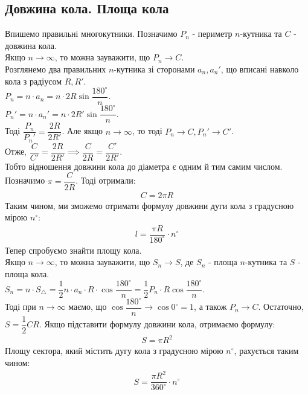 \documentclass[a4paper, 10pt]{article}
\theoremstyle{theoremdd}
\theoremstyle{theoremdd}
\theoremstyle{theoremdd}
\theoremstyle{theoremdd}
\theoremstyle{theoremdd}
\theoremstyle{theoremdd}
\theoremstyle{theoremdd}
\theoremstyle{theoremdd}
\theoremstyle{theoremdd}
\begin{document}
\subsection{Довжина кола. Площа кола}
Впишемо правильні многокутники. Позначимо $P_n$ - периметр $n$-кутника та $C$ - довжина кола. \\
Якщо $n \to \infty$, то можна зауважити, що $P_n \to C$.
\bigskip \\
Розглянемо два правильних $n$-кутника зі сторонами $a_n, a_n'$, що вписані навколо кола з радіусом $R,R'$.\\
$P_n = n \cdot a_n = n \cdot 2R \sin \dfrac{180^\circ}{n}$.\\
$P_n' = n \cdot a_n' = n \cdot 2R' \sin \dfrac{180^\circ}{n}$.\\
Тоді $\dfrac{P_n}{P_n'} = \dfrac{2R}{2R'}$. Але якщо $n \to \infty$, то тоді $P_n \to C, P_n' \to C'$.\\
Отже, $\dfrac{C}{C'} = \dfrac{2R}{2R'} \implies \dfrac{C}{2R} = \dfrac{C'}{2R'}$.\\
Тобто відношення довжини кола до діаметра є одним й тим самим числом.\\
Позначимо $\pi = \dfrac{C}{2R}$. Тоді отримали:
\begin{align*}
C = 2\pi R
\end{align*}
Таким чином, ми зможемо отримати формулу довжини дуги кола з градусною мірою $n^\circ$:
\begin{align*}
l = \dfrac{\pi R}{180^\circ} \cdot n^\circ
\end{align*}
Тепер спробуємо знайти площу кола.\\
Якщо $n \to \infty$, то можна зауважити, що $S_n \to S$, де $S_n$ - площа $n$-кутника та $S$ - площа кола.
\bigskip \\
$S_n = n \cdot S_{\triangle} = \dfrac{1}{2} n \cdot a_n \cdot R \cdot \cos \dfrac{180^\circ}{n} = \dfrac{1}{2} P_n \cdot R \cos \dfrac{180^\circ}{n}$.\\
Тоді при $n \to \infty$ маємо, що $\cos \dfrac{180^\circ}{n} \to \cos 0^\circ = 1$, а також $P_n \to C$. Остаточно,\\
$S = \dfrac{1}{2} CR$. Якщо підставити формулу довжини кола, отримаємо формулу:
\begin{align*}
S = \pi R^2
\end{align*}
Площу сектора, який містить дугу кола з градусною мірою $n^\circ$, рахується таким чином:
\begin{align*}
S = \dfrac{\pi R^2}{360^\circ} \cdot n^\circ
\end{align*}
\end{document}
